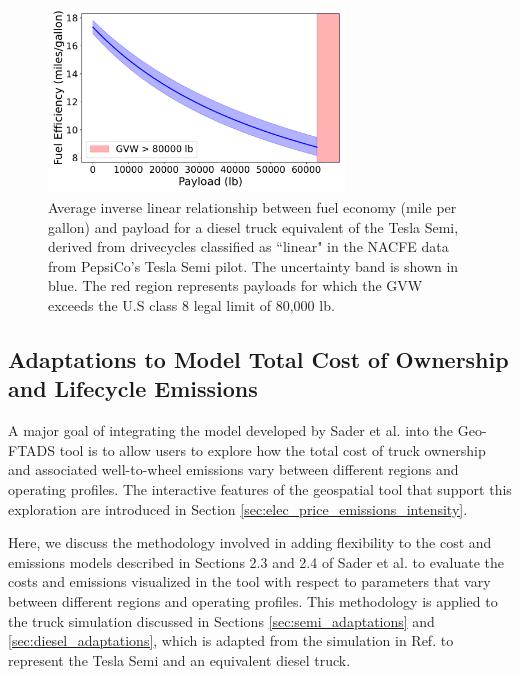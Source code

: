 \begin{figure}[H]
        \centering
        \includegraphics[width=0.7\textwidth]{figures/payload_vs_mileage_function_diesel.pdf}
        \caption{Average inverse linear relationship between fuel economy (mile per gallon) and payload for a diesel truck equivalent of the Tesla Semi, derived from drivecycles classified as ``linear" in the NACFE data from PepsiCo's Tesla Semi pilot. The uncertainty band is shown in blue. The red region represents payloads for which the GVW exceeds the U.S class 8 legal limit of 80,000 lb.}
        \label{fig:payload_vs_energy_economy_diesel}
\end{figure}

\subsection{Adaptations to Model Total Cost of Ownership and Lifecycle Emissions}

A major goal of integrating the model developed by Sader et al. \cite{Sader_2023} into the Geo-FTADS tool is to allow users to explore how the total cost of truck ownership and associated well-to-wheel emissions vary between different regions and operating profiles. The interactive features of the geospatial tool that support this exploration are introduced in Section \ref{sec:elec_price_emissions_intensity}. 

Here, we discuss the methodology involved in adding flexibility to the cost and emissions models described in Sections 2.3 and 2.4 of Sader et al. \cite{Sader_2023} to evaluate the costs and emissions visualized in the tool with respect to parameters that vary between different regions and operating profiles. This methodology is applied to the truck simulation discussed in Sections \ref{sec:semi_adaptations} and \ref{sec:diesel_adaptations}, which is adapted from the simulation in Ref. \cite{Sader_2023} to represent the Tesla Semi and an equivalent diesel truck.

